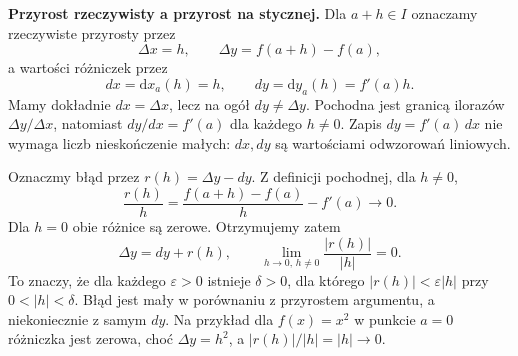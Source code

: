 \medskip
\noindent\textbf{Przyrost rzeczywisty a przyrost na stycznej.}
Dla $a+h\in I$ oznaczamy rzeczywiste przyrosty przez
\[
 \Delta x=h,\qquad \Delta y=f(a+h)-f(a),
\]
a wartości różniczek przez
\[
 dx=\mathrm{d}x_a(h)=h,\qquad dy=\mathrm{d}y_a(h)=f'(a)h.
\]
Mamy dokładnie $dx=\Delta x$, lecz na ogół $dy\ne\Delta y$. Pochodna jest granicą ilorazów $\Delta y/\Delta x$, natomiast $dy/dx=f'(a)$ dla każdego $h\ne0$. Zapis $dy=f'(a)\,dx$ nie wymaga liczb nieskończenie małych: $dx,dy$ są wartościami odwzorowań liniowych.

Oznaczmy błąd przez $r(h)=\Delta y-dy$. Z definicji pochodnej, dla $h\ne0$,
\[
 \frac{r(h)}h=\frac{f(a+h)-f(a)}h-f'(a)\longrightarrow0.
\]
Dla $h=0$ obie różnice są zerowe. Otrzymujemy zatem
\[
 \Delta y=dy+r(h),\qquad
 \lim_{h\to0,\,h\ne0}\frac{|r(h)|}{|h|}=0.
\]
To znaczy, że dla każdego $\varepsilon>0$ istnieje $\delta>0$, dla którego $|r(h)|<\varepsilon|h|$ przy $0<|h|<\delta$. Błąd jest mały w porównaniu z przyrostem argumentu, a niekoniecznie z samym $dy$. Na przykład dla $f(x)=x^2$ w punkcie $a=0$ różniczka jest zerowa, choć $\Delta y=h^2$, a $|r(h)|/|h|=|h|\to0$.

